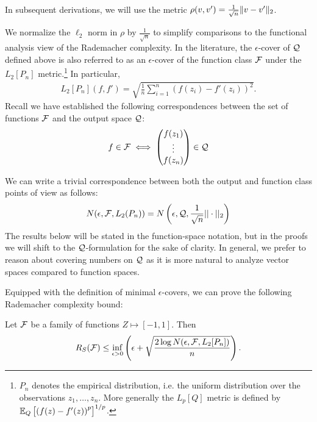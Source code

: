 In subsequent derivations, we will use the metric $\rho(v,v') = \frac 1 {\sqrt{n}} \|v-v'\|_2$. 

\begin{remark}
We normalize the $\ell_2$ norm in $\rho$ by $\frac{1}{\sqrt{n}}$ to simplify comparisons to the functional analysis view of the Rademacher complexity. In the literature, the $\epsilon$-cover of $\mathcal Q$ defined above is also referred to as an $\epsilon$-cover of the function class $\mathcal F$ under the $L_2[P_n]$ metric.\footnote{$P_n$ denotes the empirical distribution, i.e. the uniform distribution over the observations $z_1,\dots,z_n$. More generally the $L_p[Q]$ metric is defined by $\operatorname*{\mathbb{E}}_Q \left [\left (f(z) - f'(z) \right )^p \right]^{1/p}$.} In particular, 
\begin{align}
L_2[P_n](f,f') = \sqrt{ \frac 1 n \sum_{i=1}^n (f(z_i) - f'(z_i))^2 }.
\end{align}
Recall we have established the following correspondences between the set of functions $\mathcal F$ and the output space $\mathcal Q$:
\begin{align}
    f \in \mathcal F \iff \begin{pmatrix} f(z_1) \\ \vdots \\ f(z_n) \end{pmatrix} \in \mathcal Q
\end{align}

We can write a trivial correspondence between both the output and function class points of view as follows:
\begin{align}
N(\epsilon, \mathcal F, L_2(P_n)) = N\left (\epsilon, \mathcal Q, \frac{1}{\sqrt{n}} || \cdot ||_2 \right )
\end{align}
The results below will be stated in the function-space notation, but in the proofs we will shift to the $\mathcal Q$-formulation for the sake of clarity.
In general, we prefer to reason about covering numbers on $\mathcal Q$ as it is more natural to analyze vector spaces compared to function spaces.
\label{lec8:rmk:l2pncover}
\end{remark}

Equipped with the definition of minimal $\epsilon$-covers, we can prove the following Rademacher complexity bound:

\begin{theorem}\label{lec8:thm:rc-covering-bd}
Let $\mathcal F$ be a family of functions $Z \mapsto [-1,1]$. Then
\begin{equation}
R_S(\mathcal F) \le \inf_{\epsilon > 0} \left( \epsilon + \sqrt{ \frac {2\log N(\epsilon, \mathcal F, L_2[P_n])} n } \right). \label{lec8:eqn:rc-covering-bd}
\end{equation}
\end{theorem}

